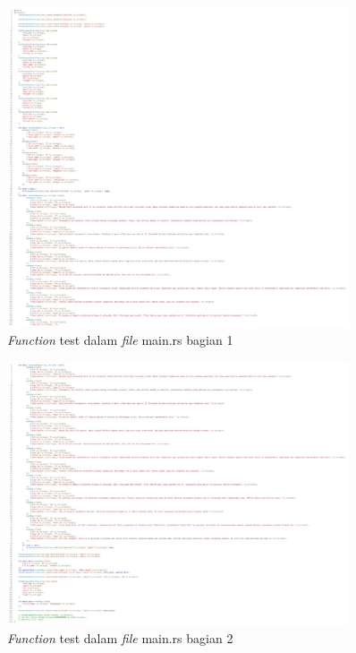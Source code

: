 \begin{figure}[H]
  \centering{}
	\includegraphics[width=0.9\textwidth]{gambar/lampiran/file-main-test-1.png}
  \caption{\emph{Function} test dalam \emph{file} main.rs bagian 1}
\end{figure}

\begin{figure}[H]
  \centering{}
	\includegraphics[width=0.9\textwidth]{gambar/lampiran/file-main-test-2.png}
  \caption{\emph{Function} test dalam \emph{file} main.rs bagian 2}
\end{figure}

